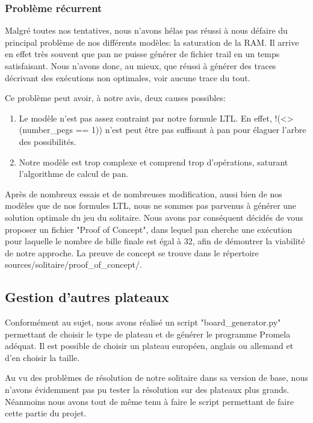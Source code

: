 \documentclass[12pt, a4paper]{report}
\begin{document}
\subsubsection{Problème récurrent}

Malgré toutes nos tentatives, nous n'avons hélas pas réussi à nous défaire du principal problème de nos différents modèles: la saturation de la RAM. Il arrive en effet très souvent que pan ne puisse générer de fichier trail en un temps satisfaisant. Nous n'avons donc, au mieux, que réussi à générer des traces décrivant des exécutions non optimales, voir aucune trace du tout.

Ce problème peut avoir, à notre avis, deux causes possibles:
\begin{enumerate}
\item Le modèle n'est pas assez contraint par notre formule LTL. En effet, !(<>(number\_pegs == 1)) n'est peut être pas suffisant à pan pour élaguer l'arbre des possibilités.
\item Notre modèle est trop complexe et comprend trop d'opérations, saturant l'algorithme de calcul de pan.
\end{enumerate}

Après de nombreux essais et de nombreuses modification, aussi bien de nos modèles que de nos formules LTL, nous ne sommes pas parvenus à générer une solution optimale du jeu du solitaire.
Nous avons par conséquent décidés de vous proposer un fichier "Proof of Concept", dans lequel pan cherche une exécution pour laquelle le nombre de bille finale est égal à 32, afin de démontrer la viabilité de notre approche. La preuve de concept se trouve dans le répertoire sources/solitaire/proof_of_concept/.

\subsection{Gestion d'autres plateaux}

Conformément au sujet, nous avons réalisé un script "board\_generator.py" permettant de choisir le type de plateau et de générer le programme Promela adéquat. Il est possible de choisir un plateau européen, anglais ou allemand et d'en choisir la taille.

Au vu des problèmes de résolution de notre solitaire dans sa version de base, nous n'avons évidemment pas pu tester la résolution sur des plateaux plus grands. Néanmoins nous avons tout de même tenu à faire le script permettant de faire cette partie du projet.
\end{document}
